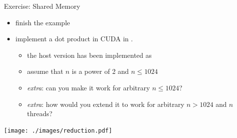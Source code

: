 \begin{frame}[fragile]{Exercise: Shared Memory}
    \begin{itemize}
        \item finish the  example
        \item implement a dot product in CUDA in .
        \begin{itemize}
            \item the host version has been implemented as 
            \item assume that $n$ is a power of 2 and $n\leq1024$
            \item \emph{extra}: can you make it work for arbitrary $n\leq1024$?
            \item \emph{extra}: how would you extend it to work for arbitrary $n>1024$ and $n$ threads?
        \end{itemize}
    \end{itemize}

    \centering \texttt{[image: ./images/reduction.pdf]}

\end{frame}

